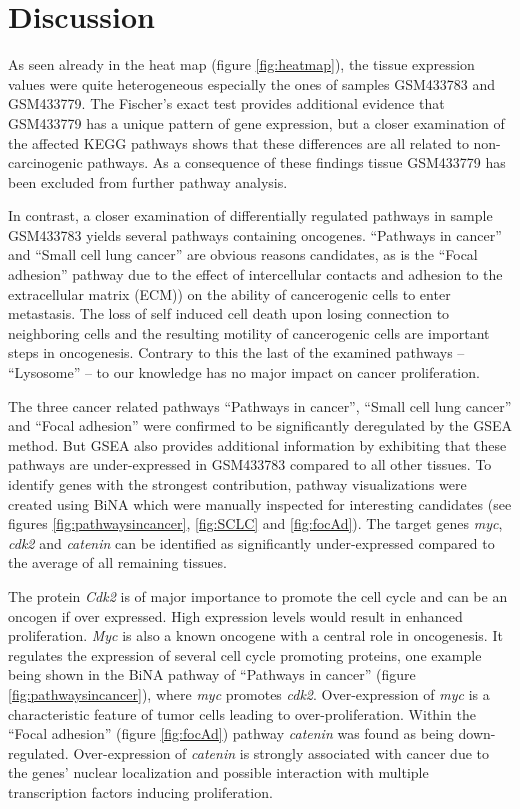 \section{Discussion}
As seen already in the heat map (figure \ref{fig:heatmap}), the tissue
expression values were quite heterogeneous especially the ones of samples
GSM433783 and GSM433779. The Fischer's exact test provides additional evidence
that GSM433779 has a unique pattern of gene expression, but a closer examination
of the affected KEGG pathways shows that these differences are all related to
non-carcinogenic pathways. As a consequence of these findings tissue GSM433779
has been excluded from further pathway analysis.

In contrast, a closer examination of differentially regulated pathways in sample
GSM433783 yields several pathways containing oncogenes. ``Pathways in cancer''
and ``Small cell lung cancer'' are obvious reasons candidates, as is the ``Focal
adhesion'' pathway due to the effect of intercellular contacts and adhesion to
the extracellular matrix (ECM)) on the ability of cancerogenic cells to enter
metastasis. The loss of self induced cell death upon losing connection to
neighboring cells and the resulting motility of cancerogenic cells are important
steps in oncogenesis. Contrary to this the last of the examined pathways --
``Lysosome'' -- to our knowledge has no major impact on cancer proliferation.

The three cancer related pathways ``Pathways in cancer'', ``Small cell lung
cancer'' and ``Focal adhesion'' were confirmed to be significantly deregulated
by the GSEA method. But GSEA also provides additional information by exhibiting
that these pathways are under-expressed in GSM433783 compared to all other
tissues. To identify genes with the strongest contribution, pathway
visualizations were created using BiNA which were manually inspected for
interesting candidates (see figures \ref{fig:pathwaysincancer}, \ref{fig:SCLC}
and \ref{fig:focAd}). The target genes \textit{myc}, \textit{cdk2} and
\textit{catenin} can be identified as significantly under-expressed compared to
the average of all remaining tissues.

The protein \textit{Cdk2} is of major importance to promote the cell cycle and
can be an oncogen if over expressed\cite{Du2004}. High expression levels would
result in enhanced proliferation. \textit{Myc} is also a known
oncogene\cite{Dang2005} with a central role in oncogenesis. It regulates the
expression of several cell cycle promoting proteins, one example being shown in
the BiNA pathway of ``Pathways in cancer'' (figure \ref{fig:pathwaysincancer}),
where \textit{myc} promotes \textit{cdk2}. Over-expression of \textit{myc} is a
characteristic feature of tumor cells leading to over-proliferation. Within the
``Focal adhesion'' (figure \ref{fig:focAd}) pathway \textit{catenin} was found
as being down-regulated. Over-expression of \textit{catenin} is strongly
associated with cancer\cite{MacDonald2009} due to the genes' nuclear
localization and possible interaction with multiple transcription factors
inducing proliferation.

